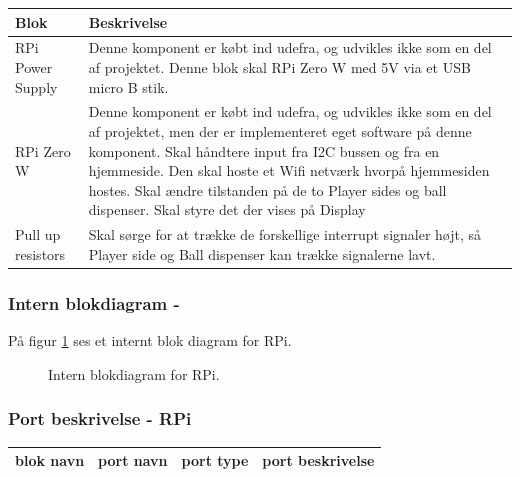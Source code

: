 \documentclass[Arkitektur/System_main.tex]{subfiles}
\begin{document}
\begin{table}[H]
\centering
\begin{tabular}{|L{0.2\columnwidth}|L{0.7\columnwidth}|}
\hline
\textbf{Blok} & \textbf{Beskrivelse} \\ \hline
RPi Power Supply & Denne komponent er købt ind udefra, og udvikles ikke som en del af projektet. Denne blok skal RPi Zero W med 5V via et USB micro B stik.\\ \hline
RPi Zero W & Denne komponent er købt ind udefra, og udvikles ikke som en del af projektet, men der er implementeret eget software på denne komponent. Skal håndtere input fra I2C bussen og fra en hjemmeside. Den skal hoste et Wifi netværk hvorpå hjemmesiden hostes. Skal ændre tilstanden på de to Player sides og ball dispenser. Skal styre det der vises på Display \\ \hline
Pull up resistors & Skal sørge for at trække de forskellige interrupt signaler højt, så Player side og Ball dispenser kan trække signalerne lavt. \\ \hline 

\end{tabular}
\end{table}

\subsubsection{Intern blokdiagram - } \label{sec:rpi_hardware_ibd}


På figur \ref{fig:rpi_hardware_ibd} ses et internt blok diagram for RPi. 

\begin{figure}[H]
    \centering
    \caption{Intern blokdiagram for RPi.}
    \label{fig:rpi_hardware_ibd}
\end{figure}

\subsubsection{Port beskrivelse - RPi} \label{sec:RPi_hardware_ports}


\begin{table}[]
\begin{tabular}{|l|l|l|l|}
\hline
blok navn                            & port navn         & port type & port beskrivelse \\ \hline
\end{tabular}
\end{table}
\end{document}

